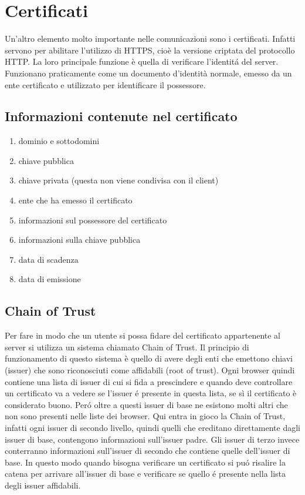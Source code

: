 \section{Certificati}
\cite{certificates}
Un'altro elemento molto importante nelle comunicazioni sono i certificati. Infatti servono per abilitare l'utilizzo di HTTPS, cioè la versione criptata del protocollo HTTP. La loro principale funzione è quella di verificare l'identitá del server. Funzionano praticamente come un documento d'identità normale, emesso da un ente certificato e utilizzato per identificare il possessore.
\subsection{Informazioni contenute nel certificato}
\begin{enumerate}
  \item dominio e sottodomini
  \item chiave pubblica
  \item chiave privata (questa non viene condivisa con il client)
  \item ente che ha emesso il certificato
  \item informazioni sul possessore del certificato
  \item informazioni sulla chiave pubblica
  \item data di scadenza
  \item data di emissione

\end{enumerate}
\subsection{Chain of Trust}
Per fare in modo che un utente si possa fidare del certificato appartenente al server si utilizza un sistema chiamato Chain of Trust. Il principio di funzionamento di questo sistema è quello di avere degli enti che emettono chiavi (issuer) che sono riconosciuti come affidabili (root of trust). Ogni browser quindi contiene una lista di issuer di cui si fida a prescindere e quando deve controllare un certificato va a vedere se l'issuer é presente in questa lista, se sì il certificato è considerato buono. Peró oltre a questi issuer di base ne esistono molti altri che non sono presenti nelle liste dei browser. Qui entra in gioco la Chain of Trust, infatti ogni issuer di secondo livello, quindi quelli che ereditano direttamente dagli issuer di base, contengono informazioni sull'issuer padre. Gli issuer di terzo invece conterranno informazioni sull'issuer di secondo che contiene quelle dell'issuer di base. In questo modo quando bisogna verificare un certificato si puó risalire la catena per arrivare all'issuer di base e verificare se quello é presente nella lista degli issuer affidabili.

